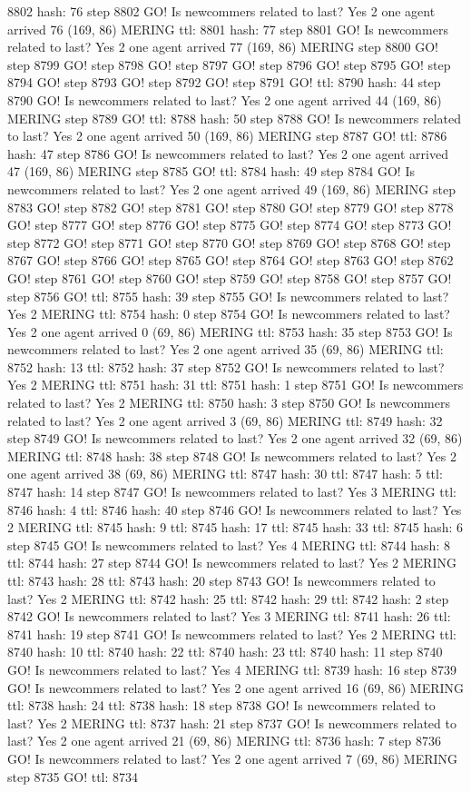 8802 hash: 76 step 8802 GO! Is newcommers related to last? Yes 2 one agent arrived 76 (169, 86) MERING ttl: 8801 hash: 77 step 8801 GO! Is newcommers related to last? Yes 2 one agent arrived 77 (169, 86) MERING step 8800 GO! step 8799 GO! step 8798 GO! step 8797 GO! step 8796 GO! step 8795 GO! step 8794 GO! step 8793 GO! step 8792 GO! step 8791 GO! ttl: 8790 hash: 44 step 8790 GO! Is newcommers related to last? Yes 2 one agent arrived 44 (169, 86) MERING step 8789 GO! ttl: 8788 hash: 50 step 8788 GO! Is newcommers related to last? Yes 2 one agent arrived 50 (169, 86) MERING step 8787 GO! ttl: 8786 hash: 47 step 8786 GO! Is newcommers related to last? Yes 2 one agent arrived 47 (169, 86) MERING step 8785 GO! ttl: 8784 hash: 49 step 8784 GO! Is newcommers related to last? Yes 2 one agent arrived 49 (169, 86) MERING step 8783 GO! step 8782 GO! step 8781 GO! step 8780 GO! step 8779 GO! step 8778 GO! step 8777 GO! step 8776 GO! step 8775 GO! step 8774 GO! step 8773 GO! step 8772 GO! step 8771 GO! step 8770 GO! step 8769 GO! step 8768 GO! step 8767 GO! step 8766 GO! step 8765 GO! step 8764 GO! step 8763 GO! step 8762 GO! step 8761 GO! step 8760 GO! step 8759 GO! step 8758 GO! step 8757 GO! step 8756 GO! ttl: 8755 hash: 39 step 8755 GO! Is newcommers related to last? Yes 2 MERING ttl: 8754 hash: 0 step 8754 GO! Is newcommers related to last? Yes 2 one agent arrived 0 (69, 86) MERING ttl: 8753 hash: 35 step 8753 GO! Is newcommers related to last? Yes 2 one agent arrived 35 (69, 86) MERING ttl: 8752 hash: 13 ttl: 8752 hash: 37 step 8752 GO! Is newcommers related to last? Yes 2 MERING ttl: 8751 hash: 31 ttl: 8751 hash: 1 step 8751 GO! Is newcommers related to last? Yes 2 MERING ttl: 8750 hash: 3 step 8750 GO! Is newcommers related to last? Yes 2 one agent arrived 3 (69, 86) MERING ttl: 8749 hash: 32 step 8749 GO! Is newcommers related to last? Yes 2 one agent arrived 32 (69, 86) MERING ttl: 8748 hash: 38 step 8748 GO! Is newcommers related to last? Yes 2 one agent arrived 38 (69, 86) MERING ttl: 8747 hash: 30 ttl: 8747 hash: 5 ttl: 8747 hash: 14 step 8747 GO! Is newcommers related to last? Yes 3 MERING ttl: 8746 hash: 4 ttl: 8746 hash: 40 step 8746 GO! Is newcommers related to last? Yes 2 MERING ttl: 8745 hash: 9 ttl: 8745 hash: 17 ttl: 8745 hash: 33 ttl: 8745 hash: 6 step 8745 GO! Is newcommers related to last? Yes 4 MERING ttl: 8744 hash: 8 ttl: 8744 hash: 27 step 8744 GO! Is newcommers related to last? Yes 2 MERING ttl: 8743 hash: 28 ttl: 8743 hash: 20 step 8743 GO! Is newcommers related to last? Yes 2 MERING ttl: 8742 hash: 25 ttl: 8742 hash: 29 ttl: 8742 hash: 2 step 8742 GO! Is newcommers related to last? Yes 3 MERING ttl: 8741 hash: 26 ttl: 8741 hash: 19 step 8741 GO! Is newcommers related to last? Yes 2 MERING ttl: 8740 hash: 10 ttl: 8740 hash: 22 ttl: 8740 hash: 23 ttl: 8740 hash: 11 step 8740 GO! Is newcommers related to last? Yes 4 MERING ttl: 8739 hash: 16 step 8739 GO! Is newcommers related to last? Yes 2 one agent arrived 16 (69, 86) MERING ttl: 8738 hash: 24 ttl: 8738 hash: 18 step 8738 GO! Is newcommers related to last? Yes 2 MERING ttl: 8737 hash: 21 step 8737 GO! Is newcommers related to last? Yes 2 one agent arrived 21 (69, 86) MERING ttl: 8736 hash: 7 step 8736 GO! Is newcommers related to last? Yes 2 one agent arrived 7 (69, 86) MERING step 8735 GO! ttl: 8734 